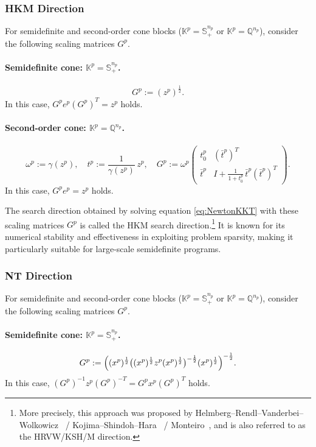 \subsubsection{HKM Direction}
For semidefinite and second-order cone blocks ($\mathbb{K}^p = \mathbb{S}^{n_p}_+$ or $\mathbb{K}^p = \mathbb{Q}^{n_p}$), consider the following scaling matrices $G^p$.

\paragraph{Semidefinite cone: \(\mathbb{K}^p = \mathbb{S}^{n_p}_+\).}
\[
  G^p := (z^p)^{\tfrac12}.
\]
In this case, $G^p e^p (G^p)^T = z^p$ holds.

\paragraph{Second-order cone: \(\mathbb{K}^p = \mathbb{Q}^{n_p}\).}
\[
  \omega^p := \gamma(z^p), 
  \quad
  t^p := \frac{1}{\gamma(z^p)}\, z^p,
  \quad
  G^p :=
  \omega^p
  \begin{pmatrix}
    t^p_0 & (\bar{t}^p)^T \\
    \bar{t}^p & I + \frac{1}{1+t^p_0}\,\bar{t}^p(\bar{t}^p)^T
  \end{pmatrix}.
\]
In this case, $G^p e^p = z^p$ holds.

\medskip 

The search direction obtained by solving equation \eqref{eq:NewtonKKT} with these scaling matrices $G^p$ is called the HKM search direction.\footnote{
More precisely, this approach was proposed by Helmberg--Rendl--Vanderbei--Wolkowicz~\cite{Helmberg1996} / Kojima--Shindoh--Hara~\cite{Kojima1997} / Monteiro~\cite{Monteiro1997}, and is also referred to as the HRVW/KSH/M direction.
} 
It is known for its numerical stability and effectiveness in exploiting problem sparsity, making it particularly suitable for large-scale semidefinite programs.


\subsubsection{NT Direction}
For semidefinite and second-order cone blocks ($\mathbb{K}^p = \mathbb{S}^{n_p}_+$ or $\mathbb{K}^p = \mathbb{Q}^{n_p}$), consider the following scaling matrices $G^p$.

\paragraph{Semidefinite cone: \(\mathbb{K}^p = \mathbb{S}^{n_p}_+\).}
\[
  G^p 
  := 
    \Bigl( (x^p)^{\frac12} \bigl( (x^p)^{\frac12} z^p (x^p)^{\frac12} \bigr)^{-\frac12} (x^p)^{\frac12} \Bigr)^{-\frac12}.
\]
In this case, $(G^p)^{-1} z^p (G^p)^{-T} = G^p x^p (G^p)^T$ holds. 

